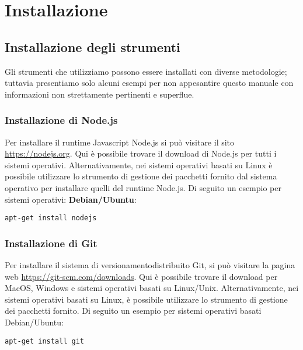 \section{Installazione}
\subsection{Installazione degli strumenti}
Gli strumenti che utilizziamo possono essere installati con diverse metodologie; tuttavia presentiamo solo alcuni esempi per non appesantire questo manuale con informazioni non strettamente pertinenti e superflue.
\subsubsection{Installazione di Node.js}
Per installare il runtime Javascript Node.js si può visitare il sito \url{https://nodejs.org}. Qui è possibile trovare il download di Node.js per tutti i sistemi operativi. Alternativamente, nei sistemi operativi basati su Linux è possibile utilizzare lo strumento di gestione dei pacchetti fornito dal sistema operativo per installare quelli del runtime Node.js.
Di seguito un esempio per sistemi operativi: \textbf{Debian/Ubuntu}:
\begin{verbatim}
apt-get install nodejs
\end{verbatim}

\subsubsection{Installazione di Git}
Per installare il sistema di versionamento\glosp distribuito Git, si può visitare la pagina web \url{https://git-scm.com/downloads}. Qui è possibile trovare il download per MacOS, Windows e sistemi operativi basati su Linux/Unix. Alternativamente, nei sistemi operativi basati su Linux, è possibile utilizzare lo strumento di gestione dei pacchetti fornito. Di seguito un esempio per sistemi operativi basati Debian/Ubuntu:
\begin{verbatim}
apt-get install git
\end{verbatim}